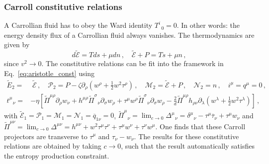 \documentclass[superscriptaddress,prd,nofootinbib,preprintnumbers,longbibliography,11pt,eqsecnum]{revtex4-1}
\def\d{\partial}
\begin{document}
\subsubsection{Carroll constitutive relations}\label{carroll_const}
A Carrollian fluid has to obey the Ward identity $T^{i}_{\;\;0}=0$. In other words: the energy density flux of a Carrollian fluid always vanishes. The thermodynamics are given by
\begin{equation}
	d\tilde{\mathcal{E}}
	=
	Tds
	+
	\mu dn
	\,,
	\quad
	\tilde{\mathcal{E}}
	+
	P
	=
	T
	s
	+
	\mu
	n
	\,,
\end{equation}
since $v^{2}\to0$. The constitutive relations can be fit into the framework in Eq.~\eqref{eq:aristotle_const} using
\begin{equation}\begin{aligned}
	\tilde{E}_{2}
	=&\;
	\tilde{\mathcal{E}}
	\,,
	\quad
	\mathcal{P}_{2}=P-\zeta \partial_{\rho} \left(w^\rho + \frac{1}{2}  w^2 \tau^\rho  \right)
	\,,\quad
	\mathcal{M}_{2}
	=
	\tilde{\mathcal{E}}+P
	\,,
	\quad
	\mathcal{N}_{2}=n
	\,,
	\quad
	i^{\mu}=q^{\mu}
	=
	0
	\,,
	\\
	t_{\;\;\,\nu}^{\mu} =& -\eta 
	\left[
		\tilde{\Pi}^{\mu\rho}
	  	\partial_{\rho} w_\nu 
		+ 
		h^{\mu \rho} \tilde{\Pi}^{\sigma}_{\;\;\,\nu}\d_{\sigma} w_\rho 
		+
		\tau^\mu w^\rho \tilde{\Pi}^{\sigma}_{\;\;\,\nu}\d_{\sigma} w_\rho 
		- 
		\frac{2}{d} \tilde{\Pi}^{\mu \rho} h_{\rho \nu} 
		\d_\lambda \left(w^\lambda
			+ 
			\frac{1}{2}w^2 \tau^\lambda  
		\right)   
	\right]\,,
\end{aligned}\end{equation}
with $\tilde{\mathcal{E}}_{1}=\mathcal{P}_{1}=\mathcal{M}_{1}=\mathcal{N}_{1}=\overline{q}_{1\nu}=0$, $\tilde{\Pi}^{\mu}_{\;\;\,\nu}=\lim_{c\to0}\Delta^{\mu}_{\;\;\,\nu}=\delta^{\mu}_{\;\;\,\nu}-\tau^{\mu}\overline{\tau}_{\nu}+\tau^{\mu}w_{\nu}$ and $\tilde{\Pi}^{\mu\nu}=\lim_{c\to0}\Delta^{\mu\nu}=h^{\mu \nu} +w^2 \tau^\mu \tau^\nu + \tau^{\mu}w^{\nu}+\tau^{\nu}w^{\mu}$. One finds that these Carroll projectors are transverse to $\tau^{\mu}$ and $\tau_{\nu}-w_{\nu}$. The results for these constitutive relations are obtained by taking $c\to0$, such that the result automatically satisfies the entropy production constraint.
\end{document}
